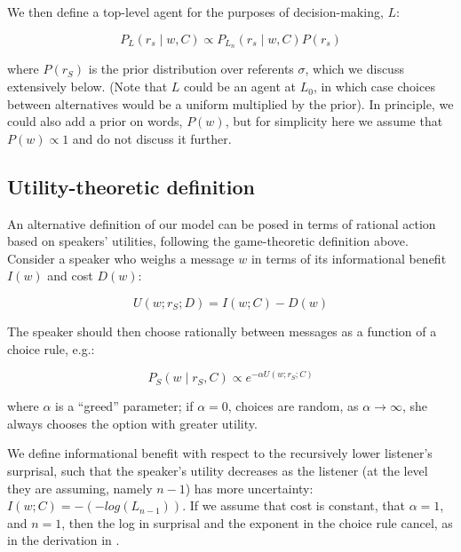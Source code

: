 \documentclass[man,noapacite]{apa2}
\begin{document}
We then define a top-level agent for the purposes of decision-making, $L$:

\begin{equation}
P_L (r_s \mid w, C) \propto P_{L_n} (r_s \mid w, C) P(r_s)
\end{equation}

\noindent where $P(r_S)$ is the prior distribution over referents $\sigma$, which we discuss extensively below. (Note that $L$ could be an agent at $L_0$, in which case choices between alternatives would be a uniform multiplied by the prior). In principle, we could also add a prior on words, $P(w)$, but for simplicity here we assume that $P(w) \propto 1$ and do not discuss it further.

\subsection{Utility-theoretic definition}

An alternative definition of our model can be posed in terms of rational action based on speakers' utilities, following the game-theoretic definition above. Consider a speaker who weighs a message $w$ in terms of its informational benefit $I(w)$ and cost $D(w)$:

\begin{equation}
U(w; r_S; D) = I(w; C) - D(w)
\end{equation}

\noindent The speaker should then choose rationally between messages as a function of a choice rule, e.g.:

\begin{equation}
P_S(w \mid r_S, C) \propto e^{-\alpha U(w;r_S; C)}
\end{equation}

\noindent where $\alpha$ is a ``greed'' parameter; if $\alpha=0$, choices are random, as $\alpha \rightarrow \infty$, she always chooses the option with greater utility.

We define informational benefit with respect to the recursively lower listener's surprisal, such that the speaker's utility decreases as the listener (at the level they are assuming, namely $n-1$) has more uncertainty: $I(w; C) = -(-log(L_{n-1}))$. If we assume that cost is constant, that $\alpha=1$, and $n=1$, then the log in surprisal and the exponent in the choice rule cancel, as in the derivation in .
\end{document}
